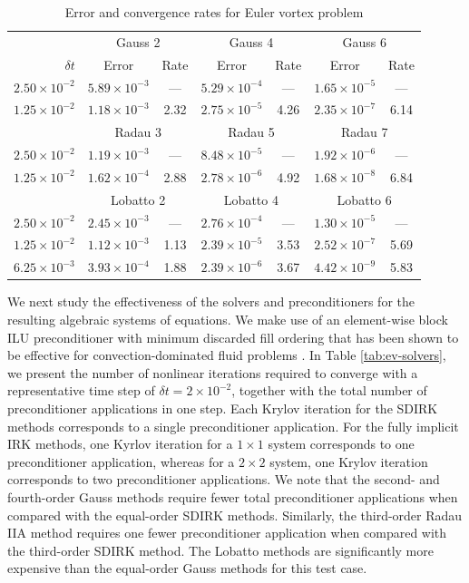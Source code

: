 \documentclass[review]{siamart}
\begin{document}
\begin{table}
	\centering
	\caption{Error and convergence rates for Euler vortex problem}
	\label{tab:ev-errors}
	\begin{tabular}{r|cccccc}
		\toprule
		& \multicolumn{2}{c}{Gauss 2} & \multicolumn{2}{c}{Gauss 4} & \multicolumn{2}{c}{Gauss 6}\\
		$\delta t$ & Error & Rate & Error & Rate & Error & Rate\\
		\midrule
		$2.50\times 10^{-2}$ & $5.89 \times 10^{-3}$ & --- & $5.29 \times 10^{-4}$ & --- & $1.65 \times 10^{-5}$ & --- \\
		$1.25\times 10^{-2}$ & $1.18 \times 10^{-3}$ & 2.32 & $2.75 \times 10^{-5}$ & 4.26 & $2.35 \times 10^{-7}$ & 6.14 \\
		\midrule
		& \multicolumn{2}{c}{Radau 3} & \multicolumn{2}{c}{Radau 5} & \multicolumn{2}{c}{Radau 7}\\
		\midrule
		$2.50\times 10^{-2}$ & $1.19 \times 10^{-3}$ & --- & $8.48 \times 10^{-5}$ & --- & $1.92 \times 10^{-6}$ & --- \\
		$1.25\times 10^{-2}$ & $1.62 \times 10^{-4}$ & 2.88 & $2.78 \times 10^{-6}$ & 4.92 & $1.68 \times 10^{-8}$ & 6.84 \\
		\midrule
		& \multicolumn{2}{c}{Lobatto 2} & \multicolumn{2}{c}{Lobatto 4} & \multicolumn{2}{c}{Lobatto 6}\\
		\midrule
		$2.50\times 10^{-2}$ & $2.45 \times 10^{-3}$ & --- & $2.76 \times 10^{-4}$ & --- & $1.30 \times 10^{-5}$ & --- \\
		$1.25\times 10^{-2}$ & $1.12 \times 10^{-3}$ & 1.13 & $2.39 \times 10^{-5}$ & 3.53 & $2.52 \times 10^{-7}$ & 5.69 \\
		$6.25\times 10^{-3}$ & $3.93 \times 10^{-4}$ & 1.88 & $2.39 \times 10^{-6}$ & 3.67 & $4.42 \times 10^{-9}$ & 5.83 \\
		\bottomrule
	\end{tabular}
\end{table}

We next study the effectiveness of the solvers and preconditioners for the resulting algebraic systems of equations.
We make use of an element-wise block ILU preconditioner with minimum discarded fill ordering that has been shown to be effective for convection-dominated fluid problems \cite{Persson2008}.
In Table \ref{tab:ev-solvers}, we present the number of nonlinear iterations required to converge with a representative time step of $\delta t = 2 \times 10^{-2}$, together with the total number of preconditioner applications in one step.
Each Krylov iteration for the SDIRK methods corresponds to a single preconditioner application.
For the fully implicit IRK methods, one Kyrlov iteration for a $1\times1$ system corresponds to one preconditioner application, whereas for a $2\times2$ system, one Krylov iteration corresponds to two preconditioner applications.
We note that the second- and fourth-order Gauss methods require fewer total preconditioner applications when compared with the equal-order SDIRK methods.
Similarly, the third-order Radau IIA method requires one fewer preconditioner application when compared with the third-order SDIRK method.
The Lobatto methods are significantly more expensive than the equal-order Gauss methods for this test case.
\end{document}
